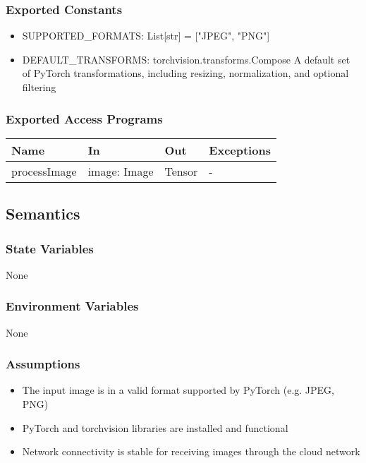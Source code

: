 \documentclass[12pt, titlepage]{article}
\begin{document}
\subsubsection{Exported Constants}

\begin{itemize}
  \item SUPPORTED{\_}FORMATS: List[str] = ["JPEG", "PNG"]
  \item DEFAULT{\_}TRANSFORMS: torchvision.transforms.Compose\: A default set of PyTorch transformations, including resizing, normalization, and optional filtering
\end{itemize}

\subsubsection{Exported Access Programs}

\begin{center}
\begin{tabular}{p{4cm} p{4cm} p{4cm} p{3.5cm}}
\hline
\textbf{Name} & \textbf{In} & \textbf{Out} & \textbf{Exceptions} \\
\hline
processImage & image: Image & Tensor & - \\
\hline
\end{tabular}
\end{center}

\subsection{Semantics}

\subsubsection{State Variables}
None



\subsubsection{Environment Variables}
None

\subsubsection{Assumptions}
\begin{itemize}
  \item The input image is in a valid format supported by PyTorch (e.g. JPEG, PNG)
  \item PyTorch and torchvision libraries are installed and functional
  \item Network connectivity is stable for receiving images through the cloud network
\end{itemize}
\end{document}
